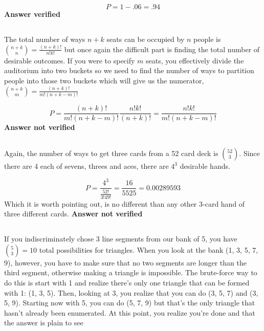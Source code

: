 \begin{equation}
	P=1-.06=.94
\label{answer1.5}
\end{equation}
\textbf{Answer verified}


\subsection{}
The total number of ways $n+k$ seats can be occupied by $n$ people is $\binom{n+k}{n}=\frac{(n+k)!}{n!k!}$ but once again the difficult part is finding the total number of desirable outcomes. If you were to specify $m$ seats, you effectively divide the auditorium into two buckets so we need to find the number of ways to partition people into those two buckets which will give us the numerator, $\binom{n+k}{m}=\frac{(n+k)!}{m!(n+k-m)!}$

\begin{equation}
	P=\frac{(n+k)!}{m!(n+k-m)!}\frac{n!k!}{(n+k)!}=\frac{{n!k!}}{m!(n+k-m)!}
\label{answer1.6}
\end{equation}
\textbf{Answer not verified}


\subsection{}

Again, the number of ways to get three cards from a 52 card deck is $\binom{52}{3}$.  Since there are 4 each of sevens, threes and aces, there are $4^3$ desirable hands.

\begin{equation}
	P=\frac{4^3}{\frac{52!}{3!49!}}=\frac{16}{5525}=0.00289593
\label{answer1.7}
\end{equation}
Which it is worth pointing out, is no different than any other 3-card hand of three different cards.
\textbf{Answer not verified}

\subsection{}
If you indiscriminately chose 3 line segments from our bank of 5, you have $\binom{5}{3}=10$ total possibilities for triangles.  When you look at the bank (1, 3, 5, 7, 9), however, you have to make sure that no two segments are longer than the third segment, otherwise making a triangle is impossible.  The brute-force way to do this is start with 1 and realize there's only one triangle that can be formed with 1: (1, 3, 5).  Then, looking at 3, you realize that you can do (3, 5, 7) and (3, 5, 9).  Starting now with 5, you can do (5, 7, 9) but that's the only triangle that hasn't already been enumerated.  At this point, you realize you're done and that the answer is plain to see

